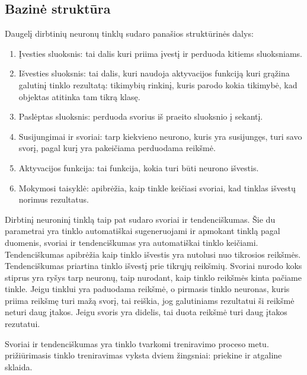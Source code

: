 \documentclass{VUMIFInfKursinis}
\begin{document}
\subsection{Bazinė struktūra}
Daugelį dirbtinių neuronų tinklų sudaro panašios struktūrinės dalys:
\begin{enumerate}
  \item Įvesties sluoksnis: tai dalis kuri priima įvestį ir perduoda kitiems sluoksniams.
  \item Išvesties sluoksnis: tai dalis, kuri naudoja aktyvacijos funkciją kuri grąžina galutinį tinklo rezultatą: tikimybių rinkinį, kuris parodo kokia tikimybė, kad objektas atitinka tam tikrą klasę.
  \item Paslėptas sluoksnis: perduoda svorius iš praeito sluoksnio į sekantį.
  \item Susijungimai ir svoriai: tarp kiekvieno neurono, kuris yra susijungęs, turi savo svorį, pagal kurį yra pakeičiama perduodama reikšmė.
  \item Aktyvacijos funkcija: tai funkcija, kokia turi būti neurono išvestis.
  \item Mokymosi taisyklė: apibrėžia, kaip tinkle keičiasi svoriai, kad tinklas išvestų norimus rezultatus.
\end{enumerate}
\par
Dirbtinį neuroninį tinklą taip pat sudaro svoriai ir tendenciškumas. Šie du parametrai yra
tinklo automatiškai sugeneruojami ir apmokant tinklą pagal duomenis, svoriai ir tendenciškumas
yra automatiškai tinklo keičiami. Tendenciškumas apibrėžia kaip tinklo išvestis yra nutolusi
nuo tikrosios reikšmės. Tendenciškumas priartina tinklo išvestį prie tikrųjų reikšmių. Svoriai
nurodo koks stiprus yra ryšys tarp neuronų, taip nurodant, kaip tinklo reikšmės kinta pačiame tinkle.
Jeigu tinklui yra paduodama reikšmė, o pirmasis tinklo neuronas, kuris priima reikšmę turi mažą
svorį, tai reiškia, jog galutiniams rezultatui ši reikšmė neturi daug įtakos. Jeigu svoris yra
didelis, tai duota reikšmė turi daug įtakos rezutatui.
\par
Svoriai ir tendenciškumas yra tinklo tvarkomi treniravimo proceso metu.
prižiūrimasis tinklo treniravimas vyksta dviem žingsniai: priekine ir atgaline sklaida.
\end{document}
